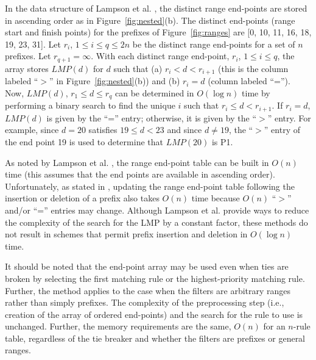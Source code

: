 In the data structure of
Lampson et al. \cite{lamp}, the distinct range
end-points are stored in ascending order as in Figure~\ref{fig:nested}(b).
The distinct
end-points (range start and finish points) for the prefixes of
Figure~\ref{fig:ranges}
are [0, 10, 11, 16, 18, 19, 23, 31]. Let $r_i$, $1 \leq i \leq q \leq 2n$
be the distinct range end-points for a set of $n$ prefixes.
Let $r_{q+1} = \infty$.
With each distinct range end-point, $r_i$, $1 \leq i \leq q$, the
array stores $LMP(d)$ for
$d$ such that (a) $r_i < d < r_{i+1}$ (this is the column labeled ``$>$''
in Figure~\ref{fig:nested}(b))
and (b) $r_i = d$ (column labeled ``='').
Now, $LMP(d)$,
$r_1 \leq d \leq r_q$ can be determined
in $O(\log n)$ time by performing a binary search to
find the unique $i$ such that $r_i \leq d < r_{i+1}$. If $r_i = d$, $LMP(d)$
is given by the ``='' entry; otherwise, it is given by the
``$>$'' entry.
For example, since $d = 20$ satisfies $19 \leq d < 23$ and since $d \neq 19$,
the ``$>$'' entry of the end point 19 is used to determine that
$LMP(20)$ is P1.

As noted by Lampson et al. \cite{lamp}, the range end-point table can be built
in $O(n)$ time (this assumes that the end points are available in
ascending order). Unfortunately, as stated in \cite{lamp}, updating the
range end-point table following the insertion or
deletion of a prefix also takes $O(n)$ time because $O(n)$ ``$>$'' and/or ``=''
entries may change. Although Lampson et al. \cite{lamp} provide ways to
reduce the complexity of the search for the LMP by a
constant factor, these methods do not result in schemes that permit
prefix insertion and deletion in $O(\log n)$ time.

It should be noted that the end-point array may be used even when
ties are broken by selecting the first matching rule or the highest-priority
matching rule. Further,
the method applies to the case when the filters are arbitrary
ranges rather than simply prefixes. The complexity of the preprocessing
step (i.e., creation of the array of ordered end-points) and the search
for the rule to use is unchanged. Further, the memory requirements are
the same, $O(n)$ for an $n$-rule table, regardless of the tie breaker and
whether the filters are prefixes or general ranges.

